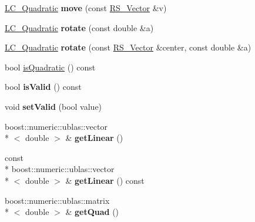 \begin{DoxyCompactItemize}
\item 
\hypertarget{classLC__Quadratic_accd983d5c44c54c5ca8f9ee179cb01de}{\hyperlink{classLC__Quadratic}{L\-C\-\_\-\-Quadratic} {\bfseries move} (const \hyperlink{classRS__Vector}{R\-S\-\_\-\-Vector} \&v)}\label{classLC__Quadratic_accd983d5c44c54c5ca8f9ee179cb01de}

\item 
\hypertarget{classLC__Quadratic_ad538806409121051a84f7c016b6ced83}{\hyperlink{classLC__Quadratic}{L\-C\-\_\-\-Quadratic} {\bfseries rotate} (const double \&a)}\label{classLC__Quadratic_ad538806409121051a84f7c016b6ced83}

\item 
\hypertarget{classLC__Quadratic_ad4fe5d6138fe87a4baece4e3d3af4751}{\hyperlink{classLC__Quadratic}{L\-C\-\_\-\-Quadratic} {\bfseries rotate} (const \hyperlink{classRS__Vector}{R\-S\-\_\-\-Vector} \&center, const double \&a)}\label{classLC__Quadratic_ad4fe5d6138fe87a4baece4e3d3af4751}

\item 
bool \hyperlink{classLC__Quadratic_a062a67626a75b148866598aa7dd0f2db}{is\-Quadratic} () const 
\item 
\hypertarget{classLC__Quadratic_a8ecf957d8fcc7e21e362069492c1371f}{bool {\bfseries is\-Valid} () const }\label{classLC__Quadratic_a8ecf957d8fcc7e21e362069492c1371f}

\item 
\hypertarget{classLC__Quadratic_ab2fc688e6e087526b789faf3a7cd98de}{void {\bfseries set\-Valid} (bool value)}\label{classLC__Quadratic_ab2fc688e6e087526b789faf3a7cd98de}

\item 
\hypertarget{classLC__Quadratic_ab48fb08fcd960798d62c6d088f7c4ef9}{boost\-::numeric\-::ublas\-::vector\\*
$<$ double $>$ \& {\bfseries get\-Linear} ()}\label{classLC__Quadratic_ab48fb08fcd960798d62c6d088f7c4ef9}

\item 
\hypertarget{classLC__Quadratic_a1e9fcaa3c2b820d3a33c6317dfa094b1}{const \\*
boost\-::numeric\-::ublas\-::vector\\*
$<$ double $>$ \& {\bfseries get\-Linear} () const }\label{classLC__Quadratic_a1e9fcaa3c2b820d3a33c6317dfa094b1}

\item 
\hypertarget{classLC__Quadratic_a7b972184da3a9bd0d18f68593189c5d8}{boost\-::numeric\-::ublas\-::matrix\\*
$<$ double $>$ \& {\bfseries get\-Quad} ()}\label{classLC__Quadratic_a7b972184da3a9bd0d18f68593189c5d8}


\end{DoxyCompactItemize}
